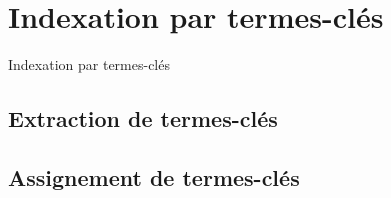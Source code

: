 \section{Indexation par termes-clés}
\begin{frame}{Indexation par termes-clés}
  \end{frame}

  \subsection{Extraction de termes-clés}

  \subsection{Assignement de termes-clés}
